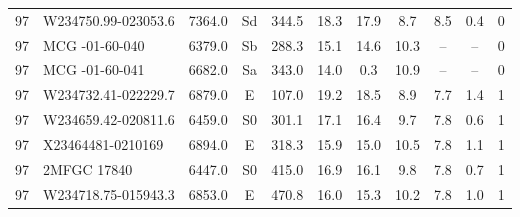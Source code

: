 {\begin{longtable}{clccccccccc}
 97 & W234750.99-023053.6 & 7364.0 & Sd & 344.5 & 18.3 & 17.9 & 8.7 & 8.5 & 0.4 & 0 \\ 
 97 & MCG -01-60-040 & 6379.0 & Sb & 288.3 & 15.1 & 14.6 & 10.3 & -- & -- & 0 \\ 
 97 & MCG -01-60-041 & 6682.0 & Sa & 343.0 & 14.0 & 0.3 & 10.9 & -- & -- & 0 \\ 
 97 & W234732.41-022229.7 & 6879.0 & E & 107.0 & 19.2 & 18.5 & 8.9 & 7.7 & 1.4 & 1 \\ 
 97 & W234659.42-020811.6 & 6459.0 & S0 & 301.1 & 17.1 & 16.4 & 9.7 & 7.8 & 0.6 & 1 \\ 
 97 & X23464481-0210169 & 6894.0 & E & 318.3 & 15.9 & 15.0 & 10.5 & 7.8 & 1.1 & 1 \\ 
 97 & 2MFGC 17840 & 6447.0 & S0 & 415.0 & 16.9 & 16.1 & 9.8 & 7.8 & 0.7 & 1 \\ 
 97 & W234718.75-015943.3 & 6853.0 & E & 470.8 & 16.0 & 15.3 & 10.2 & 7.8 & 1.0 & 1 \\ 
 \hline
\end{longtable}}